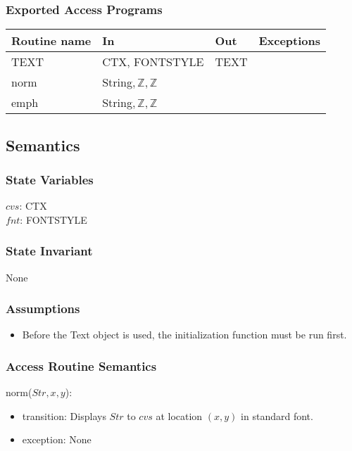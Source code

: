 \documentclass[12pt]{article}
\begin{document}
\newpage %

\subsubsection*{Exported Access Programs}

\begin{tabular}{| l | l | l | l |}
\hline
\textbf{Routine name} & \textbf{In} & \textbf{Out} & \textbf{Exceptions}\\
\hline
TEXT & CTX, FONTSTYLE & TEXT & ~\\
\hline
norm & String$, \mathbb{Z}, \mathbb{Z}$ &  & ~\\
\hline
emph & String$, \mathbb{Z}, \mathbb{Z}$ &  & ~\\
\hline
\end{tabular}

\subsection*{Semantics}

\subsubsection*{State Variables}

$cvs$: CTX\\
$fnt$: FONTSTYLE\\

\subsubsection*{State Invariant}

None

\subsubsection*{Assumptions}

\begin{itemize}
  \item Before the Text object is used, the initialization function must be run first.
\end{itemize}

\subsubsection*{Access Routine Semantics}

norm($Str,x,y$):
\begin{itemize}
    \item transition: Displays $Str$ to $cvs$ at location $(x,y)$ in standard font.
    \item exception: None
\end{itemize}
\end{document}
